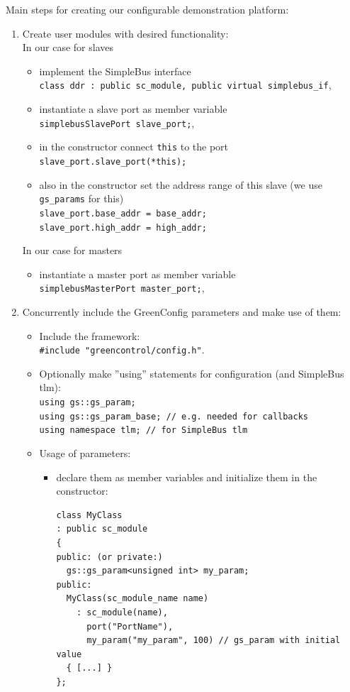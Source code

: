 \begin{samepage}
Main steps for creating our configurable demonstration platform:

\begin{enumerate}

	\item Create user modules with desired functionality:\\
	In our case for slaves
	\begin{itemize}
		\item implement the SimpleBus interface \\ \lstinline|class ddr : public sc_module, public virtual simplebus_if|,
		\item instantiate a slave port as member variable \\ \lstinline|simplebusSlavePort slave_port;|,
		\item in the constructor connect \lstinline|this| to the port \\ \lstinline|slave_port.slave_port(*this);|
		\item also in the constructor set the address range of this slave (we use \lstinline|gs_params| for this) \\ 
		\lstinline|slave_port.base_addr = base_addr;|\\
    \lstinline|slave_port.high_addr = high_addr;|
	\end{itemize}
	In our case for masters
	\begin{itemize}
		\item instantiate a master port as member variable \\ \lstinline|simplebusMasterPort master_port;|,
	\end{itemize}

 	\item Concurrently include the GreenConfig parameters and make use of them:
	\begin{itemize}
		\item Include the framework: \\ \lstinline|#include "greencontrol/config.h"|.
		\item Optionally make ''using'' statements for configuration (and SimpleBus tlm): \\ 
		  \lstinline|using gs::gs_param;|\\
		\lstinline|using gs::gs_param_base; // e.g. needed for callbacks| \\
		\lstinline|using namespace tlm; // for SimpleBus tlm|
		\item Usage of parameters:
		\begin{itemize}
			\item declare them as member variables and initialize them in the constructor:
\begin{lstlisting}
class MyClass
: public sc_module
{
public: (or private:)
  gs::gs_param<unsigned int> my_param;
public:
  MyClass(sc_module_name name)
    : sc_module(name),
      port("PortName"),
      my_param("my_param", 100) // gs_param with initial value
  { [...] }
};
\end{lstlisting}


\end{itemize}
\end{itemize}
\end{enumerate}
\end{samepage}
